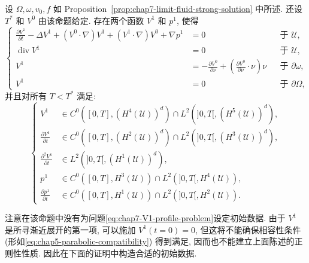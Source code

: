 \begin{sloppypar}
\begin{Proposition}
\label{prop:chap7-V1-profile-wellposedness}
设 $\Omega,\omega,v_0,f$ 如 Proposition~\ref{prop:chap7-limit-fluid-strong-solution} 中所述. 还设 $T^*$ 和 $V^0$ 由该命题给定. 存在两个函数 $V^1$ 和 $p^1$, 使得
\begin{equation}
\left\{
\begin{aligned}
 \frac{\partial V^1}{\partial t}-\Delta V^1+(V^0\cdot\nabla)V^1
 +(V^1\cdot\nabla)V^0+\nabla p^1&=0&&\text{于 }\mathcal U,\\
 \operatorname{div}V^1&=0&&\text{于 }\mathcal U,\\
 V^1&=-\frac{\partial V^0}{\partial\nu}
 +\left(\frac{\partial V^0}{\partial\nu}\cdot\nu\right)\nu
 &&\text{于 }\partial\omega,\\
 V^1&=0&&\text{于 }\partial\Omega,
\end{aligned}
\right.
\label{eq:chap7-V1-profile-problem}
\end{equation}
并且对所有 $T<T^*$ 满足:
\begin{equation}
\left\{
\begin{aligned}
 V^1&\in C^0([0,T],(H^4(\mathcal U))^d)\cap L^2(]0,T[,(H^5(\mathcal U))^d),\\
 \frac{\partial V^1}{\partial t}&\in C^0([0,T],(H^2(\mathcal U))^d)\cap L^2(]0,T[,(H^3(\mathcal U))^d),\\
 \frac{\partial^2V^1}{\partial t}&\in L^2(]0,T[,(H^1(\mathcal U))^d),\\
 p^1&\in C^0([0,T],H^3(\mathcal U))\cap L^2(]0,T[,H^4(\mathcal U)),\\
 \frac{\partial p^1}{\partial t}&\in C^0([0,T],H^1(\mathcal U))\cap L^2(]0,T[,H^2(\mathcal U)).
\end{aligned}
\right.
\label{eq:chap7-V1-profile-regularity}
\end{equation}
\end{Proposition}

注意在该命题中没有为问题\eqref{eq:chap7-V1-profile-problem}设定初始数据. 由于 $V^1$ 是所寻渐近展开的第一项, 可以施加 $V^1(t=0)=0$, 但这将不能确保相容性条件 (形如\eqref{eq:chap5-parabolic-compatibility}) 得到满足, 因而也不能建立上面陈述的正则性性质. 因此在下面的证明中构造合适的初始数据.


\end{sloppypar}

